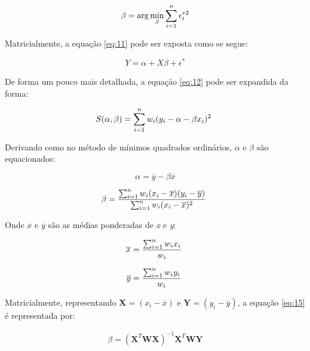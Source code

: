 \begin{equation}\label{eq:12}
 \beta =\arg\min_{\beta}\sum_{i=1}^{n}\epsilon_{i}^{*2}\\ 
\end{equation}

Matricialmente, a equação \ref{eq:11} pode ser exposta como se segue:

\begin{equation}\label{eq:11matrix}
Y = \alpha + X\beta +\epsilon^\ast
\end{equation}

De forma um pouco mais detalhada, a equação \ref{eq:12} pode ser expandida da forma:

\begin{equation}\label{eq:13}
 S(\alpha,\beta) =\sum_{i=1}^{n} w_i(y_i - \alpha - \beta x_i)^2\\\ 
\end{equation}

Derivando como no método de mínimos quadrados ordinários, $\alpha$ e $\beta$ são equacionados:

\begin{equation}\label{eq:14}
 \alpha = \overline{y} - \beta \overline{x} 
\end{equation}

\begin{equation}\label{eq:15}
  \beta =\frac{\sum_{i=1}^{n}w_i(x_i - \overline{x})(y_i - \overline{y})}{\sum_{i=1}^{n} w_i(x_i - \overline{x})^2}\\\  
\end{equation}

Onde $\overline{x}$ e $\overline{y}$ são as médias ponderadas de \textit{x} e \textit{y}:

\begin{equation*}
  \overline{x} =\frac{\sum_{i=1}^{n}w_i x_i}{w_i}\\\  
\end{equation*}

\begin{equation*}
  \overline{y} =\frac{\sum_{i=1}^{n}w_i y_i}{w_i}\\\  
\end{equation*}

Matricialmente, representando $\textbf{X} = (x_i - \overline{x})$ e $\textbf{Y} = (y_i - \overline{y})$, a equação \ref{eq:15} é representada por:

\begin{align*} \beta =(\textbf{X}^{T}\textbf{W}\textbf{X})^{-1}\textbf{X}^{T}\textbf{W}\textbf{Y} \end{align*}

